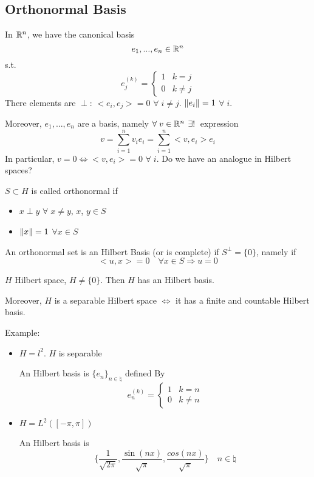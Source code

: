 \subsection*{Orthonormal Basis}

In \(\mathbb{R}^n\), we have the canonical basis
\[
    e_1, ..., e_n \in \mathbb{R}^n
\]
s.t.
\[
    e_j^{(k)} = 
    \begin{cases}
        1 & k=j \\
        0 & k \neq j   
    \end{cases}
\]
There elements are \(\perp\): \(<e_i, e_j> = 0\) \(\forall\; i \neq j\). \(\norm{e_i}=1\) \(\forall\; i\).

Moreover, \(e_1, ..., e_n\) are a basis, namely \(\forall\; v \in \mathbb{R}^n\) \(\exists! \;\) expression
\[
    v = \sum_{i=1}^n v_i e_i = \sum_{i=1}^n <v, e_i> e_i
\]
In particular, \(v=0 \iff <v, e_i>= 0\) \(\forall\; i\). Do we have an analogue in Hilbert spaces?

\begin{definition}
    \(S \subset H\) is called orthonormal if 
    \begin{itemize}
        \item \(x \perp y\) \(\forall\; x \neq y\), \(x\), \(y \in S\)
        \item \(\norm{x} = 1\) \(\forall x \in S\)
    \end{itemize}
\end{definition}
\begin{definition}
    An orthonormal set is an Hilbert Basis (or is complete) if \(S^\perp = \{0\}\), namely if 
    \[
        <u, x> = 0 \quad \forall x \in S \Rightarrow u=0
    \]
\end{definition}
\begin{theorem}
    \(H\) Hilbert space, \(H \neq \{0\}\). Then \(H\) has an Hilbert basis.

    Moreover, \(H\) is a separable Hilbert space \(\iff \) it has a finite and countable Hilbert basis.
\end{theorem}

Example:
\begin{itemize}
    \item \(H = l^2\). \(H\) is separable
    
    An Hilbert basis is \(\{e_n\}_{n \in \natural}\) defined By
    \[
        e_n^{(k)} = 
        \begin{cases}
            1 & k=n \\
            0 & k \neq n
        \end{cases}
    \]

    \item \(H = L^2([-\pi, \pi])\)
    
    An Hilbert basis is
    \[
        \lbrace \frac{1}{\sqrt{2\pi}}, \frac{\sin(nx)}{\sqrt{\pi}}, \frac{cos(nx)}{\sqrt{\pi}} \rbrace \quad n \in \natural
    \]
\end{itemize}

